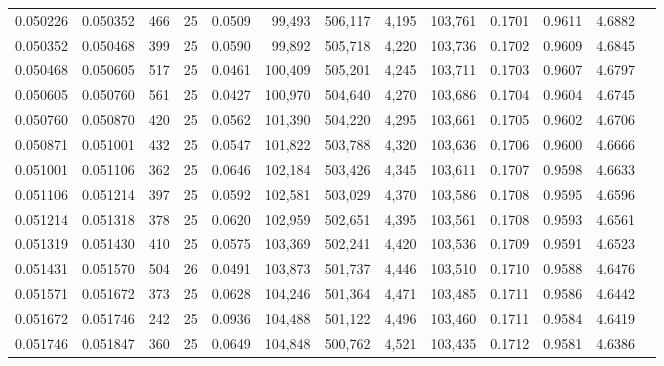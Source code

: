 \begin{tabular}{rrrrrrrrrrrrr}
0.050226 & 0.050352 &   466 &  25 &                                     0.0509 &  99,493 & 506,117 &   4,195 & 103,761 & 0.1701 & 0.9611 & 4.6882 \\
0.050352 & 0.050468 &   399 &  25 &                                     0.0590 &  99,892 & 505,718 &   4,220 & 103,736 & 0.1702 & 0.9609 & 4.6845 \\
0.050468 & 0.050605 &   517 &  25 &                                     0.0461 & 100,409 & 505,201 &   4,245 & 103,711 & 0.1703 & 0.9607 & 4.6797 \\
0.050605 & 0.050760 &   561 &  25 &                                     0.0427 & 100,970 & 504,640 &   4,270 & 103,686 & 0.1704 & 0.9604 & 4.6745 \\
0.050760 & 0.050870 &   420 &  25 &                                     0.0562 & 101,390 & 504,220 &   4,295 & 103,661 & 0.1705 & 0.9602 & 4.6706 \\
0.050871 & 0.051001 &   432 &  25 &                                     0.0547 & 101,822 & 503,788 &   4,320 & 103,636 & 0.1706 & 0.9600 & 4.6666 \\
0.051001 & 0.051106 &   362 &  25 &                                     0.0646 & 102,184 & 503,426 &   4,345 & 103,611 & 0.1707 & 0.9598 & 4.6633 \\
0.051106 & 0.051214 &   397 &  25 &                                     0.0592 & 102,581 & 503,029 &   4,370 & 103,586 & 0.1708 & 0.9595 & 4.6596 \\
0.051214 & 0.051318 &   378 &  25 &                                     0.0620 & 102,959 & 502,651 &   4,395 & 103,561 & 0.1708 & 0.9593 & 4.6561 \\
0.051319 & 0.051430 &   410 &  25 &                                     0.0575 & 103,369 & 502,241 &   4,420 & 103,536 & 0.1709 & 0.9591 & 4.6523 \\
0.051431 & 0.051570 &   504 &  26 &                                     0.0491 & 103,873 & 501,737 &   4,446 & 103,510 & 0.1710 & 0.9588 & 4.6476 \\
0.051571 & 0.051672 &   373 &  25 &                                     0.0628 & 104,246 & 501,364 &   4,471 & 103,485 & 0.1711 & 0.9586 & 4.6442 \\
0.051672 & 0.051746 &   242 &  25 &                                     0.0936 & 104,488 & 501,122 &   4,496 & 103,460 & 0.1711 & 0.9584 & 4.6419 \\
0.051746 & 0.051847 &   360 &  25 &                                     0.0649 & 104,848 & 500,762 &   4,521 & 103,435 & 0.1712 & 0.9581 & 4.6386 \\

\end{tabular}
